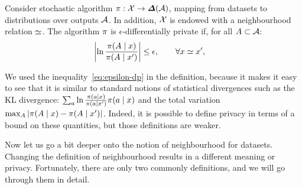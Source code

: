 \begin{frame}
    \begin{definition}
      \label{def:epsilon-dp}
      Consider stochastic algorithm $\pol : \CX \to \Simplex(\CA)$, mapping from datasets to distributions over outputs ${\mathcal{A}}$. In addition, ${\mathcal{X}}$ is endowed with a neighbourhood relation $\simeq$. The algorithm $\pi$ is  $\epsilon$-differentially private if, for all $A \subset {\mathcal{A}}$:
      \begin{equation}
        \label{eq:epsilon-dp}
        \left|\ln \frac{\pi(A \mid x)}{\pi(A \mid x')}\right| \leq \epsilon , \qquad \forall x \simeq x', \quad 
      \end{equation}
    \end{definition}
    
  We used the inequality~\eqref{eq:epsilon-dp} in the definition,
  because it makes it easy to see that it is similar to standard
  notions of statistical divergences such as the KL divergence:
  $\sum_a \ln \frac{\pi(a \mid x)}{\pi(a \mid x')} \pi(a \mid x)$
  and the total variation $\max_A |\pi(A \mid x) - \pi(A \mid
  x')|$. Indeed, it is possible to define privacy in terms of a bound
  on these quantities, but those definitions are weaker.


  Now let us go a bit deeper onto the notion of neighbourhood for datasets. Changing the definition of neighbourhood results in a different meaning 
or privacy. Fortunately, there are only two commonly definitions, and we will go through them in detail.
\end{frame}

